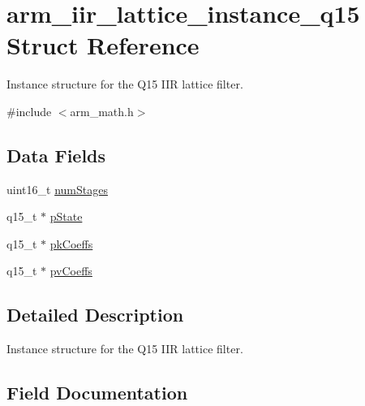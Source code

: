 \hypertarget{structarm__iir__lattice__instance__q15}{}\section{arm\+\_\+iir\+\_\+lattice\+\_\+instance\+\_\+q15 Struct Reference}
\label{structarm__iir__lattice__instance__q15}


Instance structure for the Q15 I\+IR lattice filter.  




{\ttfamily \#include $<$arm\+\_\+math.\+h$>$}

\subsection*{Data Fields}
\begin{DoxyCompactItemize}
\item 
uint16\+\_\+t \mbox{\hyperlink{structarm__iir__lattice__instance__q15_a4cceb90547b3e585d4c7aabaa8057212}{num\+Stages}}
\item 
q15\+\_\+t $\ast$ \mbox{\hyperlink{structarm__iir__lattice__instance__q15_ae29dfdb736374fcddaeaec4b7770170c}{p\+State}}
\item 
q15\+\_\+t $\ast$ \mbox{\hyperlink{structarm__iir__lattice__instance__q15_a12497c299b0341c18d497f8ab3465084}{pk\+Coeffs}}
\item 
q15\+\_\+t $\ast$ \mbox{\hyperlink{structarm__iir__lattice__instance__q15_a52866ed127c7b2a8a102e2ed1a2ebab8}{pv\+Coeffs}}
\end{DoxyCompactItemize}


\subsection{Detailed Description}
Instance structure for the Q15 I\+IR lattice filter. 

\subsection{Field Documentation}
\mbox{\label{structarm__iir__lattice__instance__q15_a4cceb90547b3e585d4c7aabaa8057212}} 
